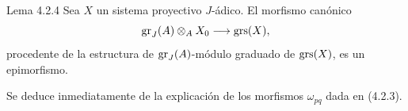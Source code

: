 \begin{statement}{Lema 4.2.4}
Sea \(X\) un sistema proyectivo \(J\)-ádico. El morfismo canónico
\[
\operatorname{gr}_J(A)\otimes_A X_0\longrightarrow \operatorname{grs}(X),
\]
procedente de la estructura de \(\operatorname{gr}_J(A)\)-módulo graduado de \(\operatorname{grs}(X)\), es un epimorfismo.
\end{statement}

\begin{prooftext}
Se deduce inmediatamente de la explicación de los morfismos \(\omega_{pq}\) dada en (4.2.3).
\end{prooftext}
